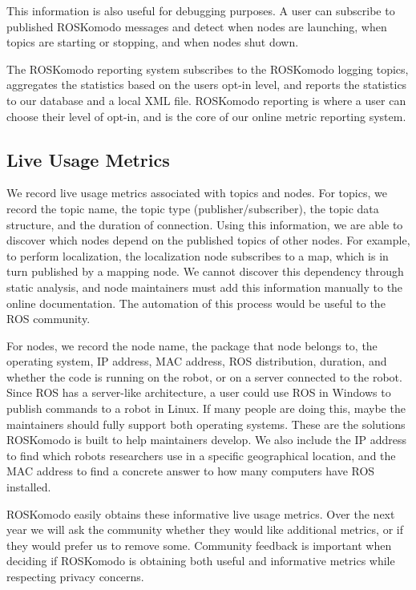 \documentclass[letterpaper, 10 pt, conference]{ieeeconf}  %
\begin{document}
This information is also useful for debugging purposes. A user can subscribe to published ROSKomodo messages and detect when nodes are launching, when topics are starting or stopping, and when nodes shut down.

The ROSKomodo reporting system subscribes to the ROSKomodo logging topics, aggregates the statistics based on the users opt-in level, and reports the statistics to our database and a local XML file. ROSKomodo reporting is where a user can choose their level of opt-in, and is the core of our online metric reporting system.

\subsection{Live Usage Metrics}

We record live usage metrics associated with topics and nodes. For topics, we record the topic name, the topic type (publisher/subscriber), the topic data structure, and the duration of connection. Using this information, we are able to discover which nodes depend on the published topics of other nodes. For example, to perform localization, the localization node subscribes to a map, which is in turn published by a mapping node. We cannot discover this dependency through static analysis, and node maintainers must add this information manually to the online documentation. The automation of this process would be useful to the ROS community.

For nodes, we record the node name, the package that node belongs to, the operating system, IP address, MAC address, ROS distribution, duration, and whether the code is running on the robot, or on a server connected to the robot. Since ROS has a server-like architecture, a user could use ROS in Windows to publish commands to a robot in Linux. If many people are doing this, maybe the maintainers should fully support both operating systems. These are the solutions ROSKomodo is built to help maintainers develop. We also include the IP address to find which robots researchers use in a specific geographical location, and the MAC address to find a concrete answer to how many computers have ROS installed.

ROSKomodo easily obtains these informative live usage metrics. Over the next year we will ask the community whether they would like additional metrics, or if they would prefer us to remove some. Community feedback is important when deciding if ROSKomodo is obtaining both useful and informative metrics while respecting privacy concerns. 
\end{document}

